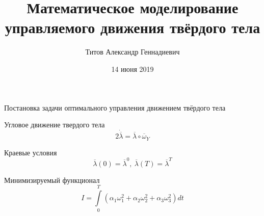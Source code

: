 \documentclass[10pt,utf8,presentation,notheorems,xcolor=dvipsnames,compress]{beamer}
\title[Мат. моделир. управления]{Математическое моделирование управляемого движения твёрдого тела}
\author[Титов А. Г.]{Титов Александр Геннадиевич}
\institute[01.03.02]{«Прикладная математика и информатика»}
\date{14 июня 2019}
\begin{document}

\begin{frame}
\titlepage
\end{frame}

\begin{frame}[t]{Постановка задачи оптимального управления движением твёрдого тела} \vspace{4pt}
\begin{block}{Угловое движение твердого тела}
\begin{equation}
2\dot{\overline{\lambda}} = \overline{\lambda} \circ \overline{\omega}_{\textit{Y}}
\end{equation}
\end{block}

\begin{block}{Краевые условия}
\begin{equation}
\overline{\lambda}(0) = \overline{\lambda}^{0},\ \overline{\lambda}(\textit{T}) = \overline{\lambda}^{\textit{T}}
\end{equation}
\end{block}
\begin{block}{Минимизируемый функционал}
\begin{equation}
\textit{I} = \int \limits_{0}^{\textit{T}} (\alpha_{1}\omega_{1}^{2}+\alpha_{2}\omega_{2}^{2}+\alpha_{3}\omega_{3}^{2}) \textit{dt}
\end{equation}
\end{block}
\end{frame}
\end{document}
